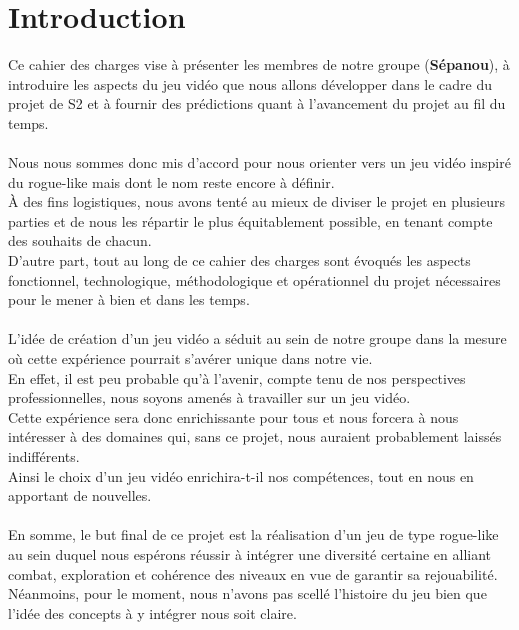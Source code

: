 \documentclass{article}
\title{
    \textbf{ \begin{center} \Huge Cahier des charges \end{center} }
    \textrm{ \underline{Groupe :} Sépanou }
}
\author{
    LO Jean-Pierre | MICHALON Loïc \and
    MICHOT Maxence | TCHEKACHEV David
}
\date{Janvier 2021}
\begin{document}
\maketitle

\pagebreak

\renewcommand*\contentsname{\textbf{\Huge Sommaire \newline}}
\large \tableofcontents

\pagebreak
\normalsize
\section{Introduction}


Ce cahier des charges vise à présenter les membres de notre groupe (\textbf{Sépanou}), à introduire les aspects du jeu vidéo que nous allons développer dans le cadre du projet de S2 et à fournir des prédictions quant à l'avancement du projet au fil du temps. \\
\\
Nous nous sommes donc mis d'accord pour nous orienter vers un jeu vidéo inspiré du rogue-like mais dont le nom reste encore à définir. \\
À des fins logistiques, nous avons tenté au mieux de diviser le projet en plusieurs parties et de nous les répartir le plus équitablement possible, en tenant compte des souhaits de chacun. \\
D'autre part, tout au long de ce cahier des charges sont évoqués les aspects fonctionnel, technologique, méthodologique et opérationnel du projet nécessaires pour le mener à bien et dans les temps. \\
\\
L'idée de création d'un jeu vidéo a séduit au sein de notre groupe dans la mesure où cette expérience pourrait s'avérer unique dans notre vie. \\
En effet, il est peu probable qu'à l'avenir, compte tenu de nos perspectives professionnelles, nous soyons amenés à travailler sur un jeu vidéo. \\
Cette expérience sera donc enrichissante pour tous et nous forcera à nous intéresser à des domaines qui, sans ce projet, nous auraient probablement laissés indifférents. \\
Ainsi le choix d'un jeu vidéo enrichira-t-il nos compétences, tout en nous en apportant de nouvelles. \\
\\
En somme, le but final de ce projet est la réalisation d'un jeu de type rogue-like au sein duquel nous espérons réussir à intégrer une diversité certaine en alliant combat, exploration et cohérence des niveaux en vue de garantir sa rejouabilité. \\
Néanmoins, pour le moment, nous n'avons pas scellé l'histoire du jeu bien que l'idée des concepts à y intégrer nous soit claire.
\end{document}

